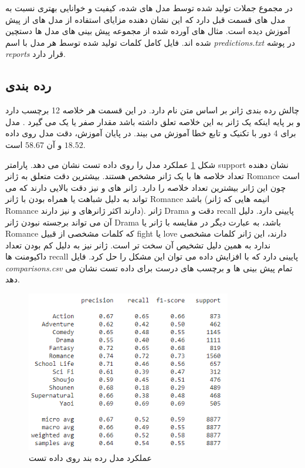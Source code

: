 در مجموع جملات تولید شده توسط مدل های 
شده، کیفیت و خوانایی بهتری نسبت به مدل های قسمت قبل دارد که این نشان دهنده مزایای استفاده از مدل های از پیش آموزش دیده است. مثال های آورده شده از مجموعه پیش بینی های مدل ها دستچین شده اند. فایل کامل کلمات تولید شده توسط هر مدل با اسم 
\textit{predictions.txt}
در پوشه 
\textit{reports}
قرار دارد.


\subsection{رده بندی}

چالش رده بندی ژانر بر اساس متن
نام دارد. در این قسمت هر خلاصه 12 برچسب دارد و بر پایه اینکه یک ژانر به این خلاصه تعلق داشته باشد مقدار صفر یا یک می گیرد \cite{Ref2}. مدل 
 برای 4 دور با تکنیک 
 و تابع خطا 
 آموزش می بیند. در پایان آموزش، دقت مدل روی داده 
 $18.52$
 و
 آن 
 $58.67$
 است.
 
 شکل \ref{fig51} عملکرد مدل را روی داده تست نشان می دهد. پارامتر
 support
 نشان دهنده تعداد خلاصه ها با یک ژانر مشخص هستند. بیشترین دقت متعلق به ژانر
 Romance
 است چون این ژانر بیشترین تعداد خلاصه را دارد. ژانر های 
 و
 نیز دقت بالایی دارند که می تواند به دلیل شباهت یا همراه بودن با ژانر 
 Romance
 باشد (انیمه هایی که ژانر Romance دارند اکثر ژانرهای
 و
 نیز دارند). ژانر 
 Drama
 دقت و recall
 پایینی دارد. دلیل آن می تواند برجسته نبودن ژانر
 Drama
 باشد، به عبارت دیگر در مقایسه با ژانر 
 یا
 Romance
 که کلمات مشخصی از قبیل 
 fight 
 یا
 love
 دارند، این ژانر کلمات مشخصی ندارد به همین دلیل تشخیص آن سخت تر است. ژانر
 نیز به دلیل کم بودن تعداد داکیومنت ها 
recall
پایینی دارد که با افزایش داده می توان این مشکل را حل کرد. فایل 
\textit{comparisons.csv}
تمام پیش بینی ها و برچسب های درست برای داده تست نشان می دهد.
 
 
 \begin{figure}[H]
 	\centering
 	
 	\includegraphics[width=0.8\textwidth,height=0.8\textheight,keepaspectratio]{images/5-1}
 	\caption{عملکرد مدل رده بند روی داده تست}
 	\label{fig51}
 	
 \end{figure} 
 


